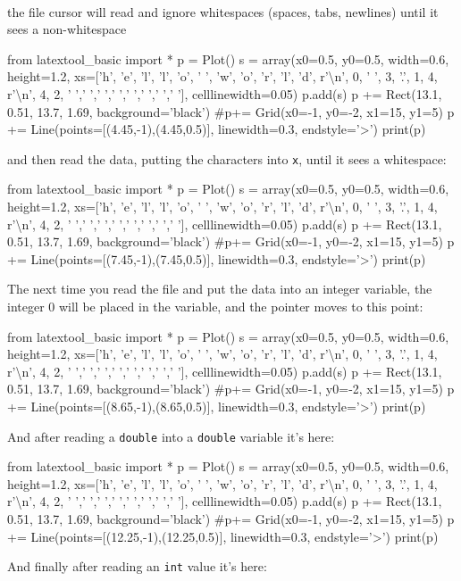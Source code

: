\begin{consolethree}[escapeinside=||]
\\

the file cursor will read and ignore whitespaces (spaces, tabs,
newlines) until it sees a non-whitespace

\begin{python}
from latextool_basic import *
p = Plot()
s = array(x0=0.5, y0=0.5, width=0.6, height=1.2, xs=['h', 'e', 'l', 'l', 'o', ' ', 'w', 'o', 'r', 'l', 'd', r'\textbackslash n', 0, ' ', 3, '.', 1, 4, r'\textbackslash  n', 4, 2, ' ',' ',' ',' ',' ',' ',' ',' '], celllinewidth=0.05)
p.add(s)
p += Rect(13.1, 0.51, 13.7, 1.69, background='black')
#p+= Grid(x0=-1, y0=-2, x1=15, y1=5)
p += Line(points=[(4.45,-1),(4.45,0.5)], linewidth=0.3, endstyle='>')
print(p)
\end{python}
and then read the data, putting the characters into \texttt{x}, until it sees a whitespace:

\begin{python}
from latextool_basic import *
p = Plot()
s = array(x0=0.5, y0=0.5, width=0.6, height=1.2, xs=['h', 'e', 'l', 'l', 'o', ' ', 'w', 'o', 'r', 'l', 'd', r'\textbackslash n', 0, ' ', 3, '.', 1, 4, r'\textbackslash  n', 4, 2, ' ',' ',' ',' ',' ',' ',' ',' '], celllinewidth=0.05)
p.add(s)
p += Rect(13.1, 0.51, 13.7, 1.69, background='black')
#p+= Grid(x0=-1, y0=-2, x1=15, y1=5)
p += Line(points=[(7.45,-1),(7.45,0.5)], linewidth=0.3, endstyle='>')
print(p)
\end{python}
The next time you read the file and put the data into an integer variable, the integer 0 will be placed in the variable, and the pointer moves to this point:

\begin{python}
from latextool_basic import *
p = Plot()
s = array(x0=0.5, y0=0.5, width=0.6, height=1.2, xs=['h', 'e', 'l', 'l', 'o', ' ', 'w', 'o', 'r', 'l', 'd', r'\textbackslash n', 0, ' ', 3, '.', 1, 4, r'\textbackslash  n', 4, 2, ' ',' ',' ',' ',' ',' ',' ',' '], celllinewidth=0.05)
p.add(s)
p += Rect(13.1, 0.51, 13.7, 1.69, background='black')
#p+= Grid(x0=-1, y0=-2, x1=15, y1=5)
p += Line(points=[(8.65,-1),(8.65,0.5)], linewidth=0.3, endstyle='>')
print(p)
\end{python}

And after reading a \texttt{double} into a \texttt{double} variable
it's here:

\begin{python}
from latextool_basic import *
p = Plot()
s = array(x0=0.5, y0=0.5, width=0.6, height=1.2, xs=['h', 'e', 'l', 'l', 'o', ' ', 'w', 'o', 'r', 'l', 'd', r'\textbackslash n', 0, ' ', 3, '.', 1, 4, r'\textbackslash  n', 4, 2, ' ',' ',' ',' ',' ',' ',' ',' '], celllinewidth=0.05)
p.add(s)
p += Rect(13.1, 0.51, 13.7, 1.69, background='black')
#p+= Grid(x0=-1, y0=-2, x1=15, y1=5)
p += Line(points=[(12.25,-1),(12.25,0.5)], linewidth=0.3, endstyle='>')
print(p)
\end{python}
And finally after reading an \texttt{int} value it's here:


\end{consolethree}
